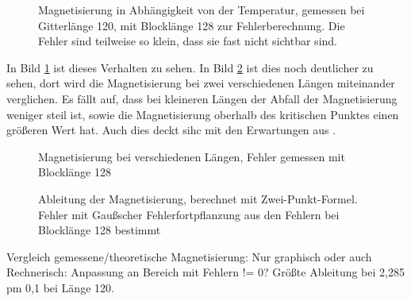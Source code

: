 \documentclass{scrreprt}
\begin{document}
	
	\begin{figure}[htbp]
		\begin{minipage}{0.48\textwidth}
			
		\end{minipage}
		\begin{minipage}{0.48\textwidth}
			
		\end{minipage}
		\caption[Magnetisierung in Abhängigkeit von der Temperatur]{Magnetisierung in Abhängigkeit von der Temperatur, gemessen bei Gitterlänge 120, mit Blocklänge 128 zur Fehlerberechnung. Die Fehler sind teilweise so klein, dass sie fast nicht sichtbar sind.}
		\label{fig:ergebnismagnetisierung}
	\end{figure}	
	
	In Bild \ref{fig:ergebnismagnetisierung} ist dieses Verhalten zu sehen. In Bild \ref{fig:maglaenge} ist dies noch deutlicher zu sehen, dort wird die Magnetisierung bei zwei verschiedenen Längen miteinander verglichen. Es fällt auf, dass bei kleineren Längen der Abfall der Magnetisierung weniger steil ist, sowie die Magnetisierung oberhalb des kritischen Punktes einen größeren Wert hat. Auch dies deckt sihc mit den Erwartungen aus \cite{binderherrmann}.%
	
	
	\begin{figure}[htbp]
		
		\label{fig:maglaenge}
		\caption[Magnetisierung bei verschiedenen Längen]{Magnetisierung bei verschiedenen Längen, Fehler gemessen mit Blocklänge 128}
	\end{figure}

	\begin{figure}[htbp]
		
		\label{fig:ableitung120128}
		\caption[Ableitung der Magnetisierung]{Ableitung der Magnetisierung, berechnet mit Zwei-Punkt-Formel. Fehler mit Gaußscher Fehlerfortpflanzung aus den Fehlern bei Blocklänge 128 bestimmt}
	\end{figure}
	
	Vergleich gemessene/theoretische Magnetisierung: Nur graphisch oder auch Rechnerisch: Anpassung an Bereich mit Fehlern != 0?
	Größte Ableitung bei 2,285 pm 0,1 bei Länge 120.
	
\end{document}
